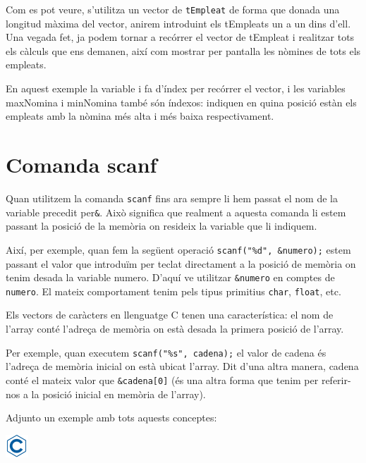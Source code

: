 \documentclass[]{book}
\begin{document}
Com es pot veure, s'utilitza un vector de \texttt{tEmpleat} de forma que
donada una longitud màxima del vector, anirem introduint els tEmpleats
un a un dins d'ell. Una vegada fet, ja podem tornar a recórrer el vector
de tEmpleat i realitzar tots els càlculs que ens demanen, així com
mostrar per pantalla les nòmines de tots els empleats.

En aquest exemple la variable i fa d'índex per recórrer el vector, i les
variables maxNomina i minNomina també són índexos: indiquen en quina
posició estàn els empleats amb la nòmina més alta i més baixa
respectivament.

\section{Comanda scanf}\label{comanda-scanf}

Quan utilitzem la comanda \texttt{scanf} fins ara sempre li hem passat
el nom de la variable precedit per\texttt{\&}. Això significa que
realment a aquesta comanda li estem passant la posició de la memòria on
resideix la variable que li indiquem.

Així, per exemple, quan fem la següent operació
\texttt{scanf("\%d",\ \&numero);} estem passant el valor que introduïm
per teclat directament a la posició de memòria on tenim desada la
variable numero. D'aquí ve utilitzar \texttt{\&numero} en comptes de
\texttt{numero}. El mateix comportament tenim pels tipus primitius
\texttt{char}, \texttt{float}, etc.

Els vectors de caràcters en llenguatge C tenen una característica: el
nom de l'array conté l'adreça de memòria on està desada la primera
posició de l'array.

Per exemple, quan executem \texttt{scanf("\%s",\ cadena);} el valor de
cadena és l'adreça de memòria inicial on està ubicat l'array. Dit d'una
altra manera, cadena conté el mateix valor que \texttt{\&cadena{[}0{]}}
(és una altra forma que tenim per referir-nos a la posició inicial en
memòria de l'array).

Adjunto un exemple amb tots aquests conceptes:

\includegraphics{./img/c.png}
\end{document}
